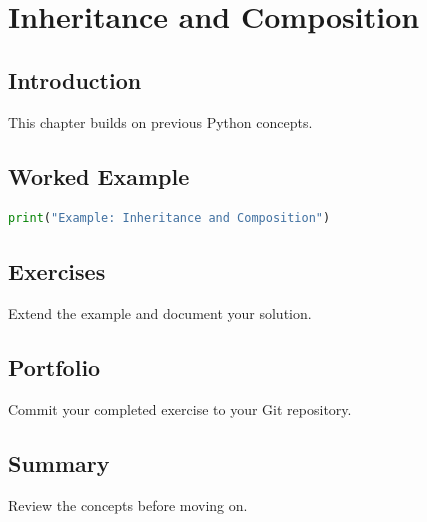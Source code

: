 \chapter{Inheritance and Composition}
\label{chap:vol3-17}



\section{Introduction}
This chapter builds on previous Python concepts.

\section{Worked Example}
\begin{lstlisting}[language=Python]
print("Example: Inheritance and Composition")
\end{lstlisting}

\section{Exercises}
\begin{exercise}
Extend the example and document your solution.
\end{exercise}

\section{Portfolio}
Commit your completed exercise to your Git repository.

\section{Summary}
Review the concepts before moving on.
